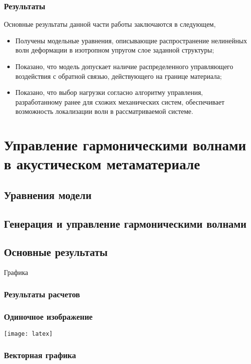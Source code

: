 \begin{frame}
	\frametitle{Результаты}
	Основные результаты данной части работы заключаются в следующем,
	\begin{itemize}
		\item{Получены модельные уравнения, описывающие распространение нелинейных волн деформации в изотропном упругом слое заданной структуры;}
		\item{Показано, что модель допускает наличие распределенного управляющего воздействия с обратной связью, действующего на границе материала;}
		\item{Показано, что выбор нагрузки согласно алгоритму управления, разработанному ранее для схожих механических систем, обеспечивает возможность локализации волн в рассматриваемой системе. }
	\end{itemize}
\end{frame}

\section{Управление гармоническими волнами в акустическом метаматериале}
\subsection{Уравнения модели}
\subsection{Генерация и управление гармоническими волнами}
\subsection{Основные результаты}
\begin{frame}
    \begin{center}
        \Huge
        Графика
    \end{center}
\end{frame}

\begin{frame}
	\frametitle{Результаты расчетов}
\end{frame}

\begin{frame}
    \frametitle{Одиночное изображение}
    \centering
    \texttt{[image: latex]} %
\end{frame}

\begin{frame}
    \frametitle{Векторная графика}
    \begin{figure}
        \centering
        
    \end{figure}
\end{frame}

